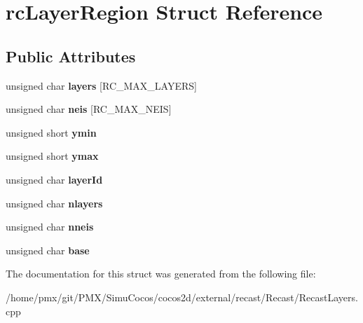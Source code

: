 \hypertarget{structrcLayerRegion}{}\section{rc\+Layer\+Region Struct Reference}
\label{structrcLayerRegion}
\subsection*{Public Attributes}
\begin{DoxyCompactItemize}
\item 
\mbox{\label{structrcLayerRegion_ab38689ddf5563c543c0ca80c4503cad7}} 
unsigned char {\bfseries layers} \mbox{[}R\+C\+\_\+\+M\+A\+X\+\_\+\+L\+A\+Y\+E\+RS\mbox{]}
\item 
\mbox{\label{structrcLayerRegion_aca9cb83bd6aa258430f00b004a8ed566}} 
unsigned char {\bfseries neis} \mbox{[}R\+C\+\_\+\+M\+A\+X\+\_\+\+N\+E\+IS\mbox{]}
\item 
\mbox{\label{structrcLayerRegion_a5d6ec3a8040c16fd837ea4e06264044c}} 
unsigned short {\bfseries ymin}
\item 
\mbox{\label{structrcLayerRegion_ac62ab3eceaca8cb92f3b72c9ef697bb4}} 
unsigned short {\bfseries ymax}
\item 
\mbox{\label{structrcLayerRegion_a98aa2992acd9a6ebcf57a401182e6b1b}} 
unsigned char {\bfseries layer\+Id}
\item 
\mbox{\label{structrcLayerRegion_a6c0f115441207bdf6eb739a000229bb2}} 
unsigned char {\bfseries nlayers}
\item 
\mbox{\label{structrcLayerRegion_ac8dbef0b5cc388f6fb6492a7a4192c61}} 
unsigned char {\bfseries nneis}
\item 
\mbox{\label{structrcLayerRegion_ad49bf74284d20c2d7c3ef56f6b4c589f}} 
unsigned char {\bfseries base}
\end{DoxyCompactItemize}


The documentation for this struct was generated from the following file\+:\begin{DoxyCompactItemize}
\item 
/home/pmx/git/\+P\+M\+X/\+Simu\+Cocos/cocos2d/external/recast/\+Recast/Recast\+Layers.\+cpp\end{DoxyCompactItemize}
